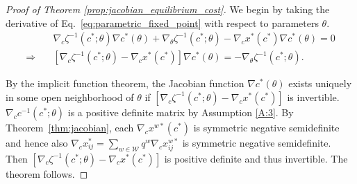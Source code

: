 \documentclass[a4paper,11pt]{article}
\begin{document}
\begin{proof}[Proof of Theorem \ref{prop:jacobian_equilibrium_cost}]
    We begin by taking the derivative of Eq.~\eqref{eq:parametric_fixed_point} with respect to parameters $\theta$.
    \begin{subequations}
        \begin{align}
            & \nabla_{c} \zeta^{-1}(c^*; \theta) \nabla c^*(\theta) + \nabla_{\theta} \zeta^{-1}(c^*; \theta) - \nabla_{c} x^*(c^*)  \nabla c^*(\theta) = 0  \\
            \Rightarrow \quad & \left[\nabla_{c} \zeta^{-1}(c^*; \theta) -  \nabla_{c}x^{*}(c^*)\right]\nabla c^*(\theta) = -\nabla_{\theta} \zeta^{-1}(c^*; \theta).
        \end{align}
    \end{subequations}

By the implicit function theorem, the Jacobian function $\nabla c^*(\theta)$ exists uniquely in some open neighborhood of $\theta$  if $\left[\nabla_{c} \zeta^{-1}(c^*; \theta) -  \nabla_{c}x^{*}(c^*)\right]$ is invertible.
    $\nabla_{c} c^{-1}(c^*; \theta)$ is a positive definite matrix by Assumption \ref{A:3}. By Theorem~\ref{thm:jacobian}, each $\nabla_{c} x^{w*}(c^*)$ is symmetric negative semidefinite and hence also $\nabla_{c}  x^*_{ij} = \sum_{w\in\mathcal{W}} q^w  \nabla_{c}  x_{ij}^{w*}$ is symmetric negative semidefinite. Then $\left[\nabla_{c} \zeta^{-1}(c^*; \theta) -  \nabla_{c}x^{*}(c^*)\right]$ is positive definite and thus invertible. The theorem follows. 
\end{proof}





\end{document}
